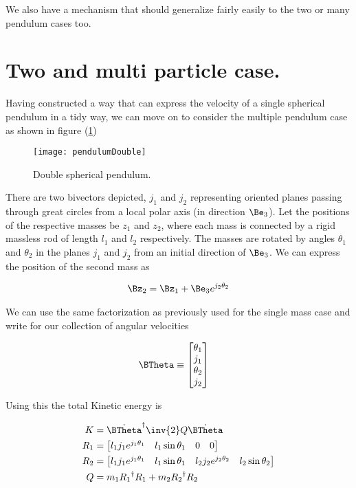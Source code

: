 We also have a mechanism that should generalize fairly easily to the two or many pendulum cases too.

\section{Two and multi particle case.}

Having constructed a way that can express the velocity of a single spherical pendulum in a tidy way, we can move on to consider the multiple pendulum case as shown in figure (\ref{fig:sPolarMultiPendulum:pendulumDouble})

\begin{figure}[htp]
\centering
\texttt{[image: pendulumDouble]}
\caption{Double spherical pendulum.}\label{fig:sPolarMultiPendulum:pendulumDouble}
\end{figure}

There are two bivectors depicted, $j_1$ and $j_2$ representing oriented planes passing through great circles from a local polar axis (in direction $\Be_3$).  Let the positions of the respective masses be $z_1$ and $z_2$, where each mass is connected by a rigid massless rod of length $l_1$ and $l_2$ respectively.  The masses are rotated by angles $\theta_1$ and $\theta_2$ in the planes $j_1$ and $j_2$ from an initial direction of $\Be_3$.  We can express the position of the second mass as

\begin{align}\label{eqn:sPolarMultiPendulum:zoo11a}
\Bz_2 = \Bz_1 + \Be_3 e^{j_2 \theta_2}
\end{align}

We can use the same factorization as previously used for the single mass case and write for our collection of angular velocities

\begin{align}\label{eqn:sPolarMultiPendulum:zoo11}
\BTheta &\equiv
\begin{bmatrix}
\theta_1 \\ j_1 \\
\theta_2 \\ j_2 \\
\end{bmatrix} 
\end{align}

Using this the total Kinetic energy is

\begin{align}\label{eqn:sPolarMultiPendulum:zoo12}
K &= {\dot{\BTheta}}^\dagger \inv{2} Q \dot{\BTheta} \\
R_1 &=
\begin{bmatrix}
l_1 j_1 e^{j_1\theta_1} & 
l_1 \sin\theta_1 &
0 &
0
\end{bmatrix} \\
R_2 &=
\begin{bmatrix}
 l_1 j_1 e^{j_1\theta_1} & 
 l_1 \sin\theta_1 &
 l_2 j_2 e^{j_2\theta_2} & 
 l_2 \sin\theta_2 
\end{bmatrix} \\
Q &=
m_1 {R_1}^\dagger R_1
+m_2 {R_2}^\dagger R_2
\end{align}

